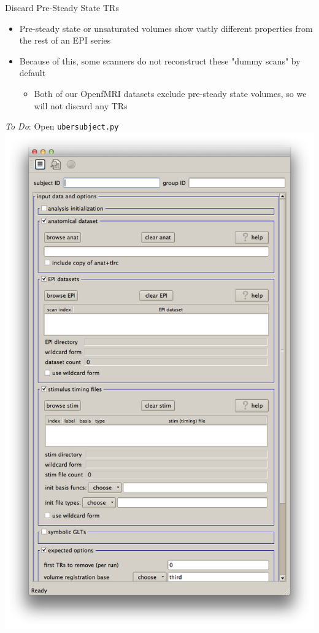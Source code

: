 \documentclass[t,12pt]{beamer}
\begin{document}
\begin{frame}{Discard Pre-Steady State TRs}
\vspace{10pt}
\begin{itemize}
\setlength\itemsep{1em}
\item Pre-steady state or unsaturated volumes show vastly different properties from the rest of an EPI series
\item Because of this, some scanners do not reconstruct these "dummy scans" by default
\vspace{4pt}
\begin{itemize}
\setlength\itemsep{0.5em}
\item Both of our OpenfMRI datasets exclude pre-steady state volumes, so we will not discard any TRs
\end{itemize}
\end{itemize}
\end{frame}

\begin{frame}{\emph{To Do}: Open \texttt{uber\textunderscore{}subject.py}}
\centering
\includegraphics[width=.65\textwidth]{images/uber_subject.png}
\end{frame}
\end{document}

